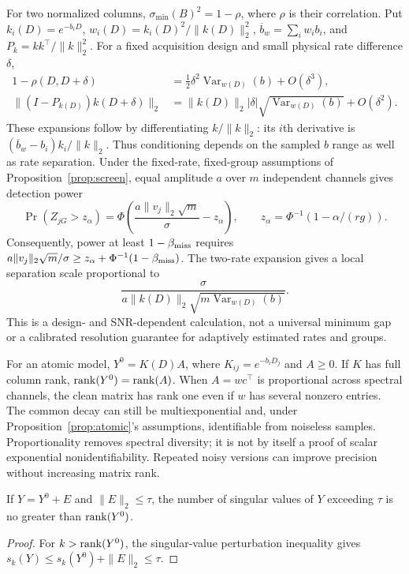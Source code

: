For two normalized columns, $\sigma_{\min}(B)^2=1-\rho$, where $\rho$ is their correlation. Put $k_i(D)=e^{-b_iD}$, $w_i(D)=k_i(D)^2/\|k(D)\|_2^2$, $\overline b_w=\sum_iw_ib_i$, and $P_k=kk^\top/\|k\|_2^2$. For a fixed acquisition design and small physical rate difference $\delta$,
\[
 \begin{aligned}
 1-\rho(D,D+\delta)
 &=\tfrac12\delta^2\operatorname{Var}_{w(D)}(b)+O(\delta^3),\\
 \|(I-P_{k(D)})k(D+\delta)\|_2
 &=\|k(D)\|_2|\delta|\sqrt{\operatorname{Var}_{w(D)}(b)}+O(\delta^2).
 \end{aligned}
\]
These expansions follow by differentiating $k/\|k\|_2$: its $i$th derivative is $(\overline b_w-b_i)k_i/\|k\|_2$. Thus conditioning depends on the sampled $b$ range as well as rate separation. Under the fixed-rate, fixed-group assumptions of Proposition~\ref{prop:screen}, equal amplitude $a$ over $m$ independent channels gives detection power
\[
 \Pr(Z_{jG}>z_\alpha)=
 \Phi\!\left(\frac{a\|v_j\|_2\sqrt m}{\sigma}-z_\alpha\right),
 \qquad z_\alpha=\Phi^{-1}(1-\alpha/(rg)).
\]
Consequently, power at least $1-\beta_{\rm miss}$ requires $a\|v_j\|_2\sqrt m/\sigma\geq z_\alpha+\Phi^{-1}(1-\beta_{\rm miss})$. The two-rate expansion gives a local separation scale proportional to
\[
 \frac{\sigma}{a\|k(D)\|_2\sqrt{m\operatorname{Var}_{w(D)}(b)}}.
\]
This is a design- and SNR-dependent calculation, not a universal minimum gap or a calibrated resolution guarantee for adaptively estimated rates and groups.

For an atomic model, $Y^0=K(D)A$, where $K_{ij}=e^{-b_iD_j}$ and $A\geq0$. If $K$ has full column rank, $\operatorname{rank}(Y^0)=\operatorname{rank}(A)$. When $A=wc^\top$ is proportional across spectral channels, the clean matrix has rank one even if $w$ has several nonzero entries. The common decay can still be multiexponential and, under Proposition~\ref{prop:atomic}'s assumptions, identifiable from noiseless samples. Proportionality removes spectral diversity; it is not by itself a proof of scalar exponential nonidentifiability. Repeated noisy versions can improve precision without increasing matrix rank.

\begin{Proposition}\label{prop:rank}
If $Y=Y^0+E$ and $\|E\|_2\leq\tau$, the number of singular values of $Y$ exceeding $\tau$ is no greater than $\operatorname{rank}(Y^0)$.
\end{Proposition}
\begin{proof}
For $k>\operatorname{rank}(Y^0)$, the singular-value perturbation inequality gives $s_k(Y)\leq s_k(Y^0)+\|E\|_2\leq\tau$.
\end{proof}


